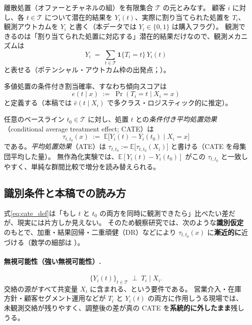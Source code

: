 \documentclass[11pt,a4paper]{article}
\newcommand{\E}{\mathbb{E}}
\newcommand{\ind}{\mathbf{1}}
\newcommand{\hehat}{\hat{e}}
\begin{document}
離散処置（オファーとチャネルの組）を有限集合 $\mathcal{T}$ の元とみなす。
顧客 $i$ に対し、各 $t\in\mathcal{T}$ について潜在的結果を $Y_i(t)$、実際に割り当てられた処置を $T_i$、観測アウトカムを $Y_i$ と書く（本データでは $Y_i\in\{0,1\}$ は購入フラグ）。
観測できるのは「割り当てられた処置に対応する」潜在的結果だけなので、観測メカニズムは
\begin{equation}
  Y_i \;=\; \sum_{t\in\mathcal{T}} \ind\{T_i=t\}\, Y_i(t)
  \label{eq:obs_identity}
\end{equation}
と表せる（ポテンシャル・アウトカム枠の出発点；\cite{ImbensRubin2015}）。

多値処置の条件付き割当確率、すなわち傾向スコアは
\begin{equation}
  e(t \mid x) \;:=\; \Pr(T_i=t \mid X_i=x)
  \label{eq:propensity_multi}
\end{equation}
と定義する（本稿では $\hehat(t\mid X_i)$ で多クラス・ロジスティック的に推定）。

任意のベースライン $t_0\in\mathcal{T}$ に対し、処置 $t$ との\emph{条件付き平均処置効果}（conditional average treatment effect; CATE）は
\begin{equation}
  \tau_{t,t_0}(x)
  \;:=\;
  \E\bigl[ Y_i(t) - Y_i(t_0) \mid X_i=x \bigr]
  \label{eq:cate_def}
\end{equation}
である。\emph{平均処置効果}（ATE）は $\tau_{t,t_0}:=\E\bigl[\tau_{t,t_0}(X_i)\bigr]$ と書ける（CATE を母集団平均した量）。
無作為化実験では、$\E[Y_i(t)-Y_i(t_0)]$ がこの $\tau_{t,t_0}$ と一致しやすく、単純な群間比較で増分を読み替えられる。

\subsection{識別条件と本稿での読み方}
式\eqref{eq:cate_def}は「もし $t$ と $t_0$ の両方を同時に観測できたら」比べたい差だが、現実には片方しか見えない。
そのため観察研究では、次のような\textbf{識別仮定}のもとで、加重・結果回帰・二重頑健（DR）などにより $\tau_{t,t_0}(x)$ に\textbf{漸近的に}近づける（数学の細部は \cite{ImbensRubin2015}）。

\paragraph{無視可能性（強い無視可能性）.}
\begin{equation}
  \{Y_i(t)\}_{t\in\mathcal{T}} \;\perp\; T_i \;\big|\; X_i .
  \label{eq:strong_ignorability}
\end{equation}
交絡の源がすべて共変量 $X_i$ に含まれる、という要件である。
営業介入・在庫方針・顧客セグメント運用などが $T_i$ と $Y_i(t)$ の両方に作用しうる現場では、未観測交絡が残りやすく、調整後の差が真の CATE を\textbf{系統的に外したまま}残しうる。
\end{document}
